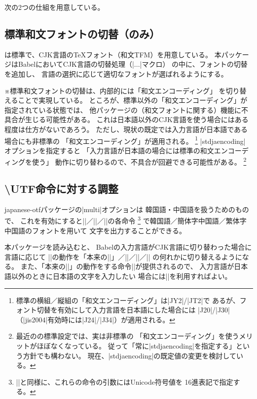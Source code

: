 \documentclass[uplatex,dvipdfmx,a4paper]{jsarticle}
\newcommand{\Pkg}[1]{\textsf{#1}}
\newcommand{\Note}{\par\noindent ※}
\newcommand{\XS}{\hspace{\xkanjiskip}}
\begin{document}
次の2つの仕組を用意している。

\subsection{標準和文フォントの切替（{\upLaTeX}のみ）}
\label{ssec:switch-jafont}

{\upTeX}は標準で、CJK言語の{\TeX}フォント（和文TFM）を用意している。
本パッケージはBabelにおいてCJK言語の切替処理（|\extras...|\XS マクロ）
の中に、フォントの切替を追加し、
言語の選択に応じて適切なフォントが選ばれるようにする。

\Note 標準和文フォントの切替は、内部的には「和文エンコーディング」
を切り替えることで実現している。
ところが、標準以外の「和文エンコーディング」が指定されている状態では、
他パッケージの（和文フォントに関する）機能に不具合が生じる可能性がある。
これは日本語以外のCJK言語を使う場合にはある程度は仕方がないであろう。
ただし、現状の既定では入力言語が日本語である場合にも非標準の
「和文エンコーディング」が適用される。%
\footnote{標準の横組／縦組の「和文エンコーディング」は|JY2|/|JT2|で
  あるが、フォント切替を有効にして入力言語を日本語にした場合には
  |J20|/|J30|（|jis2004|有効時には|J24|/|J34|）が適用される。}%
|stdjaencoding| オプションを指定すると
「入力言語が日本語の場合には標準の和文エンコーディングを使う」
動作に切り替わるので、不具合が回避できる可能性がある。%
\footnote{最近の{\upLaTeX}の標準設定では、実は非標準の
「和文エンコーディング」を使うメリットがほぼなくなっている。
従って「常に|stdjaencoding|を指定する」という方針でも構わない。
現在、|stdjaencoding|の既定値の変更を検討している。}

\subsection{{\textbackslash UTF}命令に対する調整}
\label{ssec:switch-utffont}

\Pkg{japanese-otf}パッケージの|multi|オプションは
韓国語・中国語を扱うためのもので、
これを有効にすると\XS|\UTFK|／|\UTFC|／|\UTFT|の各命令
\footnote{\XS|\UTF|と同様に、これらの命令の引数にはUnicode符号値を
  16進表記で指定する。}%
で韓国語／簡体字中国語／繁体字中国語のフォントを用いて
文字を出力することができる。

本パッケージを読み込むと、
Babelの入力言語がCJK言語に切り替わった場合に言語に応じて\XS
|\UTF|の動作を「本来の\XS|\UTF|」\<／|\UTFK|／|\UTFC|／|\UTFT|
の何れかに切り替えるようになる。
また、「本来の\XS|\UTF|」の動作をする命令\XS|\UTFJ|が提供されるので、
入力言語が日本語以外のときに日本語の文字を入力したい
場合には\XS|\UTFJ|を利用すればよい。
\end{document}

